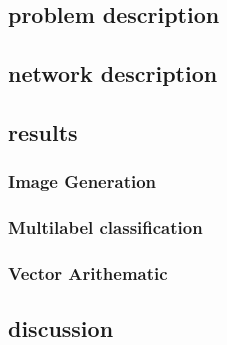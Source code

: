 \subsection{problem description}
\subsection{network description}
\subsection{results}

\subsubsection{Image Generation}
\subsubsection{Multilabel classification}
\subsubsection{Vector Arithematic}

\subsection{discussion}